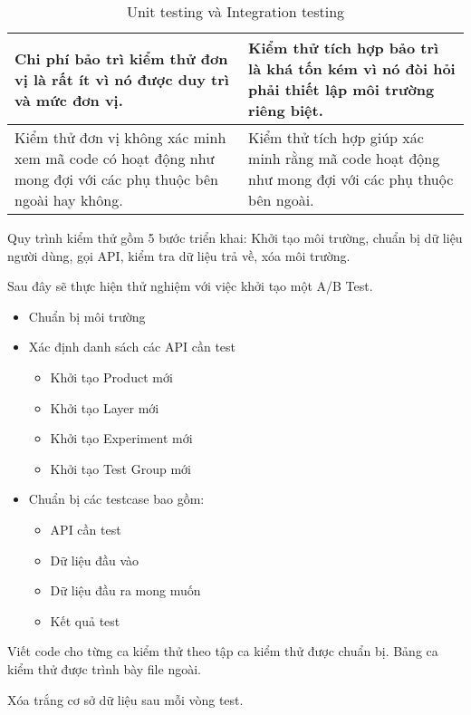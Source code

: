 \begin{table}[H]
\begin{tabular}{|p{8cm}|p{8cm}|}
		Chi phí bảo trì kiểm thử đơn vị là rất ít vì nó được duy trì và mức đơn vị.                                                                               & Kiểm thử tích hợp bảo trì là khá tốn kém vì nó đòi hỏi phải thiết lập môi trường riêng biệt.                                                 \\ \hline
		Kiểm thử đơn vị không xác minh xem mã code có hoạt động như mong đợi với các phụ thuộc bên ngoài hay không.                                               & Kiểm thử tích hợp giúp xác minh rằng mã code hoạt động như mong đợi với các phụ thuộc bên ngoài.                                             \\ \hline
	\end{tabular}
	\caption{Unit testing và Integration testing}
\end{table}

Quy trình kiểm thử gồm 5 bước triển khai: Khởi tạo môi trường, chuẩn bị dữ liệu người dùng, gọi API, kiểm tra dữ liệu trả về, xóa môi trường.


Sau đây sẽ thực hiện thử nghiệm với việc khởi tạo một A/B Test.

\begin{itemize}
	\item Chuẩn bị môi trường
	\item Xác định danh sách các API cần test
	      \begin{itemize}
		      \item Khởi tạo Product mới
		      \item Khởi tạo Layer mới
		      \item Khởi tạo Experiment mới
		      \item Khởi tạo Test Group mới
	      \end{itemize}
	\item Chuẩn bị các testcase bao gồm:
	      \begin{itemize}
		      \item API cần test
		      \item Dữ liệu đầu vào
		      \item Dữ liệu đầu ra mong muốn
		      \item Kết quả test
	      \end{itemize}
\end{itemize}

Viết code cho từng ca kiểm thử theo tập ca kiểm thử được chuẩn bị. Bảng ca kiểm thử được trình bày file ngoài.

Xóa trắng cơ sở dữ liệu sau mỗi vòng test.

